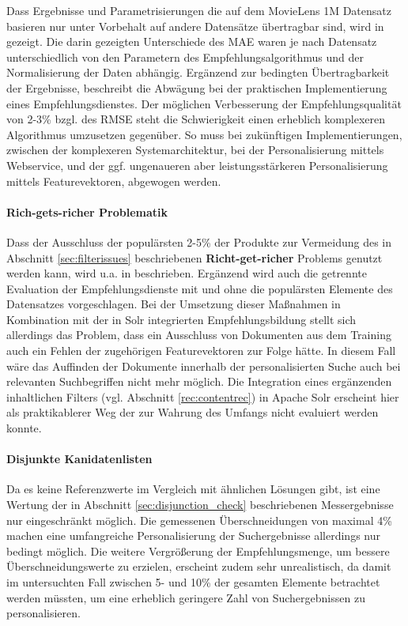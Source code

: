 Dass Ergebnisse und Parametrisierungen die auf dem MovieLens 1M Datensatz basieren nur unter Vorbehalt auf andere Datensätze übertragbar sind, wird in \citep{Howe08} gezeigt. Die darin gezeigten Unterschiede des \acs{MAE} waren je nach Datensatz unterschiedlich von den Parametern des Empfehlungsalgorithmus und der Normalisierung der Daten abhängig. Ergänzend zur bedingten Übertragbarkeit der Ergebnisse, beschreibt \citep{netflix2012_2} die Abwägung bei der praktischen Implementierung eines Empfehlungsdienstes. Der möglichen Verbesserung der Empfehlungsqualität von 2-3\% bzgl. des \acs{RMSE} steht die 
Schwierigkeit einen erheblich komplexeren Algorithmus umzusetzen gegenüber. So muss bei zukünftigen Implementierungen, zwischen der komplexeren Systemarchitektur, bei der Personalisierung mittels  Webservice, und der ggf. ungenaueren aber leistungsstärkeren Personalisierung mittels Featurevektoren, abgewogen werden.

\paragraph{Rich-gets-richer Problematik} Dass der Ausschluss der populärsten 2-5\% der Produkte zur Vermeidung des in Abschnitt \ref{sec:filterissues} beschriebenen \textbf{Richt-get-richer} Problems genutzt werden kann, wird u.a. in \citep{Cremonesi:2010:PRA:1864708.1864721} beschrieben. Ergänzend wird auch die getrennte Evaluation der Empfehlungsdienste mit und ohne die populärsten Elemente des Datensatzes vorgeschlagen. Bei der Umsetzung dieser Maßnahmen in Kombination mit der in Solr integrierten Empfehlungsbildung stellt sich allerdings das Problem, dass ein Ausschluss von Dokumenten aus dem Training auch ein Fehlen der zugehörigen Featurevektoren zur Folge hätte. In diesem Fall wäre das Auffinden der Dokumente innerhalb der personalisierten Suche auch bei relevanten Suchbegriffen nicht mehr möglich. Die Integration eines ergänzenden inhaltlichen Filters (vgl. Abschnitt \ref{rec:contentrec}) in Apache Solr erscheint hier als praktikablerer Weg der zur Wahrung des Umfangs nicht evaluiert werden konnte.

\paragraph{Disjunkte Kanidatenlisten} Da es keine Referenzwerte im Vergleich mit ähnlichen Lösungen gibt, ist eine Wertung der in Abschnitt \ref{sec:disjunction_check} beschriebenen Messergebnisse nur eingeschränkt möglich. Die gemessenen Überschneidungen von maximal 4\% machen eine umfangreiche Personalisierung der Suchergebnisse allerdings nur bedingt möglich. Die weitere Vergrößerung der Empfehlungsmenge, um bessere Überschneidungswerte zu erzielen, erscheint zudem sehr unrealistisch, da damit im untersuchten Fall zwischen  5- und 10\% der gesamten Elemente betrachtet werden müssten, um eine erheblich geringere Zahl von Suchergebnissen zu personalisieren.

